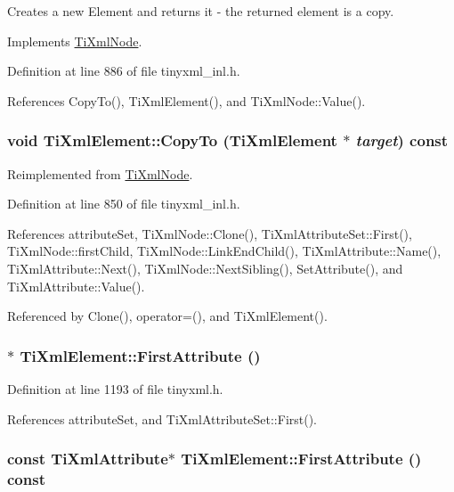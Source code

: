 Creates a new Element and returns it -\/ the returned element is a copy. 

Implements \hyperlink{class_ti_xml_node_a4508cc3a2d7a98e96a54cc09c37a78a4}{TiXmlNode}.

Definition at line 886 of file tinyxml\_\-inl.h.

References CopyTo(), TiXmlElement(), and TiXmlNode::Value().\hypertarget{class_ti_xml_element_a9e0c1983b840de4134f1f6bf7af00b0f}{
\subsubsection[{CopyTo}]{\setlength{\rightskip}{0pt plus 5cm}void TiXmlElement::CopyTo ({\bf TiXmlElement} $\ast$ {\em target}) const}}
\label{class_ti_xml_element_a9e0c1983b840de4134f1f6bf7af00b0f}


Reimplemented from \hyperlink{class_ti_xml_node_ab6056978923ad8350fb5164af32d8038}{TiXmlNode}.

Definition at line 850 of file tinyxml\_\-inl.h.

References attributeSet, TiXmlNode::Clone(), TiXmlAttributeSet::First(), TiXmlNode::firstChild, TiXmlNode::LinkEndChild(), TiXmlAttribute::Name(), TiXmlAttribute::Next(), TiXmlNode::NextSibling(), SetAttribute(), and TiXmlAttribute::Value().

Referenced by Clone(), operator=(), and TiXmlElement().\hypertarget{class_ti_xml_element_a4b33780fc565d38d6b54f640e0cf1737}{
\subsubsection[{FirstAttribute}]{$\ast$ TiXmlElement::FirstAttribute ()}}
\label{class_ti_xml_element_a4b33780fc565d38d6b54f640e0cf1737}


Definition at line 1193 of file tinyxml.h.

References attributeSet, and TiXmlAttributeSet::First().\hypertarget{class_ti_xml_element_a516054c9073647d6cb29b6abe9fa0592}{
\subsubsection[{FirstAttribute}]{\setlength{\rightskip}{0pt plus 5cm}const {\bf TiXmlAttribute}$\ast$ TiXmlElement::FirstAttribute () const}}
\label{class_ti_xml_element_a516054c9073647d6cb29b6abe9fa0592}


